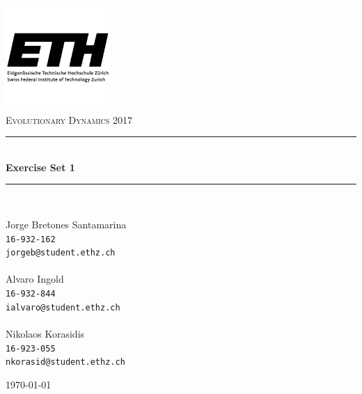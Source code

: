 \documentclass[a4paper, 11pt]{article}
\newcommand{\HRule}{\rule{\linewidth}{0.5mm}}
\begin{document}
\begin{titlepage}
\centering

\includegraphics[width=150px]{ETH.png}\\[1cm]    
\textsc{\Large Evolutionary Dynamics 2017} \\[0.5cm]

\HRule \\[0.5cm]
{\huge \bfseries Exercise Set 1}\\[0.2cm]
\HRule \\[1.5cm]

\begin{minipage}{0.4\textwidth}
\large
Jorge Bretones Santamarina \\
\texttt{16-932-162} \\
\texttt{jorgeb@student.ethz.ch} \\
\\
Alvaro Ingold \\
\texttt{16-932-844} \\
\texttt{ialvaro@student.ethz.ch} \\
\\
Nikolaos Korasidis \\
\texttt{16-923-055} \\
\texttt{nkorasid@student.ethz.ch}
\end{minipage}

\vfill

{\large \today}
\end{titlepage}

\pagestyle{myheadings}

\clearpage



%
%
%
\end{document}
